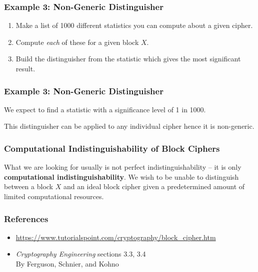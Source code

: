 \documentclass{beamer}
\newcommand{\<}{\langle}
\renewcommand{\>}{\rangle}
\begin{document}
\begin{frame}
\frametitle{Example 3: Non-Generic Distinguisher}

\begin{enumerate}
\item Make a list of 1000 different statistics you can compute about a given cipher.
\item Compute \emph{each} of these for a given block $X$.
\item Build the distinguisher from the statistic which gives the most significant result.
\end{enumerate}
\end{frame}

\begin{frame}
\frametitle{Example 3: Non-Generic Distinguisher}

We expect to find a statistic with a significance level of 1 in 1000.  \newline

This distinguisher can be applied to any individual cipher hence it is non-generic. 
\end{frame}


\begin{frame}
\frametitle{Computational Indistinguishability of Block Ciphers}

What we are looking for usually is not perfect indistinguishability -- it is only \textbf{computational indistinguishability}. We wish to be unable to distinguish between a block $X$ and an ideal block cipher given a predetermined amount of limited computational resources. 
\end{frame}


\begin{frame}
\frametitle{References}

\begin{itemize}
\item \url{https://www.tutorialspoint.com/cryptography/block_cipher.htm}
\item \emph{Cryptography Engineering} sections 3.3, 3.4 \\ By Ferguson, Schnier, and Kohno
\end{itemize}
\end{frame}
\end{document}
